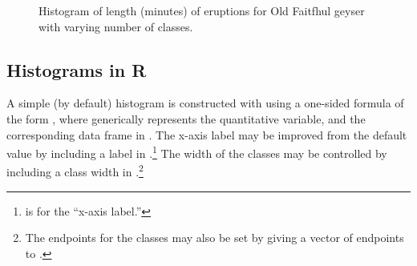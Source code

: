 \documentclass[10pt,openany]{book}\usepackage[]{graphicx}\usepackage[]{color}
\newenvironment{knitrout}{}{} %
\begin{document}
\begin{knitrout}
\color{fgcolor}


















































\begin{figure}[hbtp]

{\centering {}

}

\caption[Histogram of length (minutes) of eruptions for Old Faitfhul geyser with varying number of classes]{Histogram of length (minutes) of eruptions for Old Faitfhul geyser with varying number of classes.}\label{fig:histOF}
\end{figure}


\end{knitrout}

\subsection{Histograms in R}
A simple (by default) histogram is constructed with  using a one-sided formula of the form , where  generically represents the quantitative variable, and the corresponding data frame in .  The x-axis label may be improved from the default value by including a label in .\footnote{ is for the ``x-axis label.''}  The width of the classes may be controlled by including a class width in .\footnote{The endpoints for the classes may also be set by giving a vector of endpoints to .}
\end{document}
